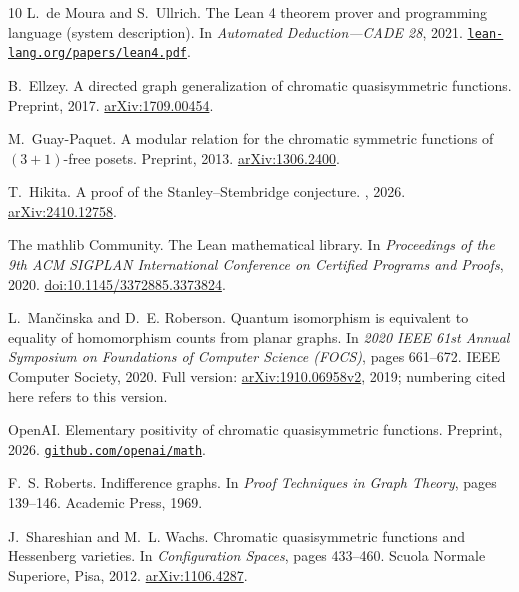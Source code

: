 \documentclass[12pt]{article}
\theoremstyle{plain}
\theoremstyle{definition}
\theoremstyle{remark}
\begin{document}
\begin{thebibliography}{10}
L.~de Moura and S.~Ullrich.
\newblock The {Lean} 4 theorem prover and programming language (system description).
\newblock In {\em Automated Deduction---CADE 28}, 2021.
\newblock \href{https://lean-lang.org/papers/lean4.pdf}{\nolinkurl{lean-lang.org/papers/lean4.pdf}}.

B.~Ellzey.
\newblock A directed graph generalization of chromatic quasisymmetric functions.
\newblock Preprint, 2017.
\newblock \href{https://arxiv.org/abs/1709.00454}{arXiv:1709.00454}.

M.~Guay-Paquet.
\newblock A modular relation for the chromatic symmetric functions of $(3+1)$-free posets.
\newblock Preprint, 2013.
\newblock \href{https://arxiv.org/abs/1306.2400}{arXiv:1306.2400}.

T.~Hikita.
\newblock A proof of the {S}tanley--{S}tembridge conjecture.
, 2026.
\newblock \href{https://arxiv.org/abs/2410.12758}{arXiv:2410.12758}.

The mathlib Community.
\newblock The {Lean} mathematical library.
\newblock In {\em Proceedings of the 9th ACM SIGPLAN International Conference on Certified Programs and Proofs}, 2020.
\newblock \href{https://doi.org/10.1145/3372885.3373824}{doi:10.1145/3372885.3373824}.

L.~Man\v{c}inska and D.~E. Roberson.
\newblock Quantum isomorphism is equivalent to equality of homomorphism counts from planar graphs.
\newblock In {\em 2020 IEEE 61st Annual Symposium on Foundations of Computer Science (FOCS)}, pages 661--672. IEEE Computer Society, 2020.
\newblock Full version: \href{https://arxiv.org/abs/1910.06958v2}{arXiv:1910.06958v2}, 2019; numbering cited here refers to this version.

OpenAI.
\newblock Elementary positivity of chromatic quasisymmetric functions.
\newblock Preprint, 2026.
\newblock \href{https://github.com/openai/math/blob/main/preprints/Elementary-Positivity-of-Chromatic-Quasisymmetric-Functions-September-24-2026/paper.pdf}{\nolinkurl{github.com/openai/math}}.

F.~S. Roberts.
\newblock Indifference graphs.
\newblock In {\em Proof Techniques in Graph Theory}, pages 139--146. Academic Press, 1969.

J.~Shareshian and M.~L. Wachs.
\newblock Chromatic quasisymmetric functions and {H}essenberg varieties.
\newblock In {\em Configuration Spaces}, pages 433--460. Scuola Normale Superiore, Pisa, 2012.
\newblock \href{https://arxiv.org/abs/1106.4287}{arXiv:1106.4287}.


\end{thebibliography}
\end{document}
